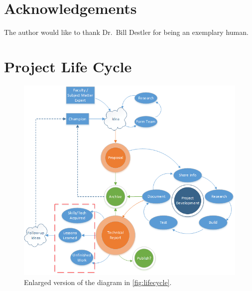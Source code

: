 \documentclass[journal]{SPEXformat}
\begin{document}
\section*{Acknowledgements}
The author would like to thank Dr.~Bill Destler for being an exemplary human.

\onecolumn
\appendices{}
\section{Project Life Cycle}
\begin{figure}[h]
  \centering
  \includegraphics[]{figs/project-life-cycle.png}
  \caption{Enlarged version of the diagram in \autoref{fig:lifecycle}.}
\end{figure}
\end{document}
